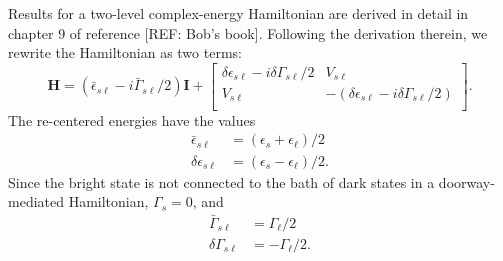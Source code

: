 \documentclass[12pt]{mitthesis}
\begin{document}
Results for a two-level complex-energy Hamiltonian are derived in
detail in chapter 9 of reference [REF: Bob's book]. Following the
derivation therein, we rewrite the Hamiltonian as two terms:
\begin{equation}
  \label{eq:complex-zero}
  \mathbf{H} = 
  (\bar{\epsilon}_{s\ell} - i \bar{\Gamma}_{s\ell} / 2) 
  \mathbf{I} +
  \begin{bmatrix}
    \delta \epsilon_{s\ell} - i \delta \Gamma_{s\ell} / 2 & V_{s\ell} \\
    V_{s\ell} & - (\delta \epsilon_{s\ell} - i \delta \Gamma_{s\ell} / 2) \\
  \end{bmatrix}.
\end{equation}
The re-centered energies have the values
\begin{subequations}
  \label{eq:energy-defs}
  \begin{align}
    \bar{\epsilon}_{s\ell} & = (\epsilon_s + \epsilon_{\ell}) / 2 \\
    \delta \epsilon_{s\ell} & = (\epsilon_s - \epsilon_{\ell}) / 2.
  \end{align}
\end{subequations}
Since the bright state is not connected to the bath of dark states in
a doorway-mediated Hamiltonian, $\Gamma_s = 0$, and
\begin{subequations}
  \label{eq:gamma-defs}
  \begin{align}
    \bar{\Gamma}_{s\ell} & = \Gamma_{\ell} / 2 \\
    \delta \Gamma_{s\ell} & = - \Gamma_{\ell} / 2.
  \end{align}
\end{subequations}
\end{document}
